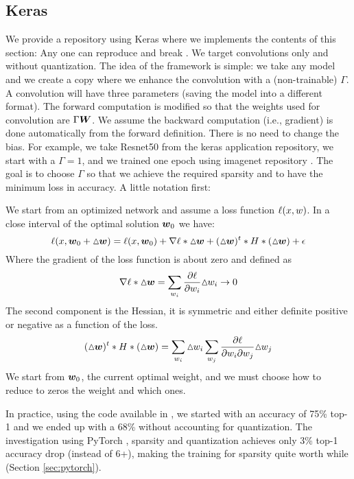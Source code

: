 \documentclass[conference]{IEEEtran}
\begin{document}
\subsection{Keras}
We provide a repository using Keras \cite{chollet2015keras} where we
implements the contents of this section: Any one can reproduce and
break \cite{PaoloK2020}. We target convolutions only and without
quantization. The idea of the framework is simple: we take any model
and we create a copy where we enhance the convolution with a
(non-trainable) $\Gamma$. A convolution will have three parameters
(saving the model into a different format).  The forward computation
is modified so that the weights used for convolution are
$\Gamma{\boldsymbol W}$. We assume the backward computation (i.e., gradient) is
done automatically from the forward definition. There is no need to
change the bias. For example, we take Resnet50 from the keras
application repository, we start with a $\Gamma=1$, and we trained one
epoch using imagenet repository \cite{deng2009imagenet}.  The goal is
to choose $\Gamma$ so that we achieve the required sparsity and to
have the minimum loss in accuracy. A little notation first:

We start from an optimized network and assume a loss function ${\bf
  \ell}(x,w)$.  In a close interval of the optimal solution ${\boldsymbol w}_0$
we have:
\begin{equation}
  \label{eq:loss}
  {\bf \ell}(x,\Vc{w}_0 +\Triangle{\Vc{w})} = {\bf \ell}(x,\Vc{w}_0) +
  \nabla{\bf \ell}*\Triangle{\Vc{w}} + (\Triangle{\Vc{w}})^t *H*
  (\Triangle{\Vc{w}}) + \epsilon
\end{equation}
Where the gradient of the loss function is about zero and defined as
\begin{equation}
  \nabla{\bf \ell}* {\vartriangle\!\! {\boldsymbol w} } = \sum_{w_i}
  \frac{\partial\ell}{\partial w_i} {\vartriangle\!\! w_i } \rightarrow 0
\end{equation}
The second component is the Hessian, it is symmetric and either
definite positive or negative as a function of the loss.
\begin{equation}
  (\Triangle{\Vc{w}})^t *H*(\Triangle{\Vc{w}}) = \sum_{w_i}
  \Triangle{w_i} \sum_{w_j} \frac{\partial\ell}{\partial w_i\partial
    w_j} \Triangle{w_j}
\end{equation}
We start from ${\boldsymbol w}_0$, the current optimal weight, and we must
choose how to reduce to zeros the weight and which ones.

In practice, using the code available in \cite{PaoloK2020}, we started
with an accuracy of 75\% top-1 and we ended up with a 68\% without
accounting for quantization. The investigation using PyTorch
\cite{pytorch_paper}, sparsity and quantization achieves only 3\%
top-1 accuracy drop (instead of 6+), making the training for sparsity
quite worth while (Section \ref{sec:pytorch}).
\end{document}
